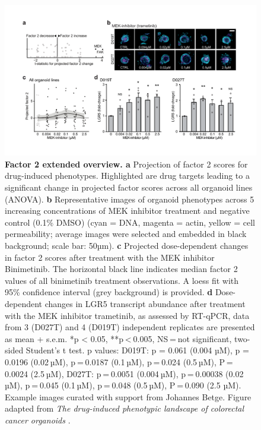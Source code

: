 \begin{flushleft}
\begin{figure}[h!]
\centering
\includegraphics[width=\textwidth,
                height=\textheight,
                keepaspectratio]{figures/promise/pdf/fig_5_3.pdf}
\caption[Factor 2 extended overview]{\textbf{Factor 2 extended overview. a} Projection of factor 2 scores for drug-induced phenotypes. Highlighted are drug targets leading to a significant change in projected factor scores across all organoid lines (ANOVA). \textbf{b} Representative images of organoid phenotypes across 5 increasing concentrations of MEK inhibitor treatment and negative control (0.1\% DMSO) (cyan = DNA, magenta = actin, yellow = cell permeability; average images were selected and embedded in black background; scale bar: 50µm). \textbf{c} Projected dose-dependent changes in factor 2 scores after treatment with the MEK inhibitor Binimetinib. The horizontal black line indicates median factor 2 values of all binimetinib treatment observations. A loess fit with 95\% confidence interval (grey background) is provided. \textbf{d} Dose-dependent changes in LGR5 transcript abundance after treatment with the MEK inhibitor trametinib, as assessed by RT-qPCR, data from 3 (D027T) and 4 (D019T) independent replicates are presented as mean + s.e.m. *p < 0.05, **p < 0.005, NS = not significant, two-sided Student’s t test. p values: D019T: p = 0.061 (0.004 µM), p = 0.0196 (0.02 µM), p = 0.0187 (0.1 µM), p = 0.024 (0.5 µM), P = 0.0024 (2.5 µM), D027T: p = 0.0051 (0.004 µM), p = 0.00038 (0.02 µM), p = 0.045 (0.1 µM), p = 0.048 (0.5 µM), P = 0.090 (2.5 µM). Example images curated with support from Johannes Betge. Figure adapted from \textit{The drug-induced phenotypic landscape of colorectal cancer organoids} \parencite{betgeDruginducedPhenotypicLandscape2022}.}
\label{fig_253}
\end{figure}
\bigbreak


\end{flushleft}
